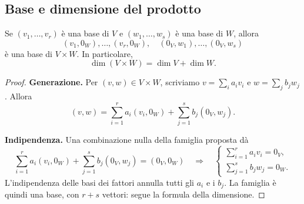 \subsection{Base e dimensione del prodotto}

\begin{proposizione}
Se $(v_1,\ldots,v_r)$ è una base di $V$ e $(w_1,\ldots,w_s)$ è una base di $W$, allora
\[
  (v_1,0_W),\ldots,(v_r,0_W),\quad(0_V,w_1),\ldots,(0_V,w_s)
\]
è una base di $V\times W$. In particolare,
\[
  \dim(V\times W)=\dim V+\dim W.
\]
\end{proposizione}
\begin{proof}
\textbf{Generazione.} Per $(v,w)\in V\times W$, scriviamo $v=\sum_i a_iv_i$ e $w=\sum_j b_jw_j$. Allora
\[
  (v,w)=\sum_{i=1}^r a_i(v_i,0_W)+\sum_{j=1}^s b_j(0_V,w_j).
\]

\textbf{Indipendenza.} Una combinazione nulla della famiglia proposta dà
\[
  \sum_{i=1}^r a_i(v_i,0_W)+\sum_{j=1}^s b_j(0_V,w_j)=(0_V,0_W)
  \quad\Longrightarrow\quad
  \begin{cases}
    \sum_{i=1}^r a_iv_i=0_V,\\
    \sum_{j=1}^s b_jw_j=0_W.
  \end{cases}
\]
L'indipendenza delle basi dei fattori annulla tutti gli $a_i$ e i $b_j$. La famiglia è quindi una base, con $r+s$ vettori: segue la formula della dimensione.
\end{proof}
